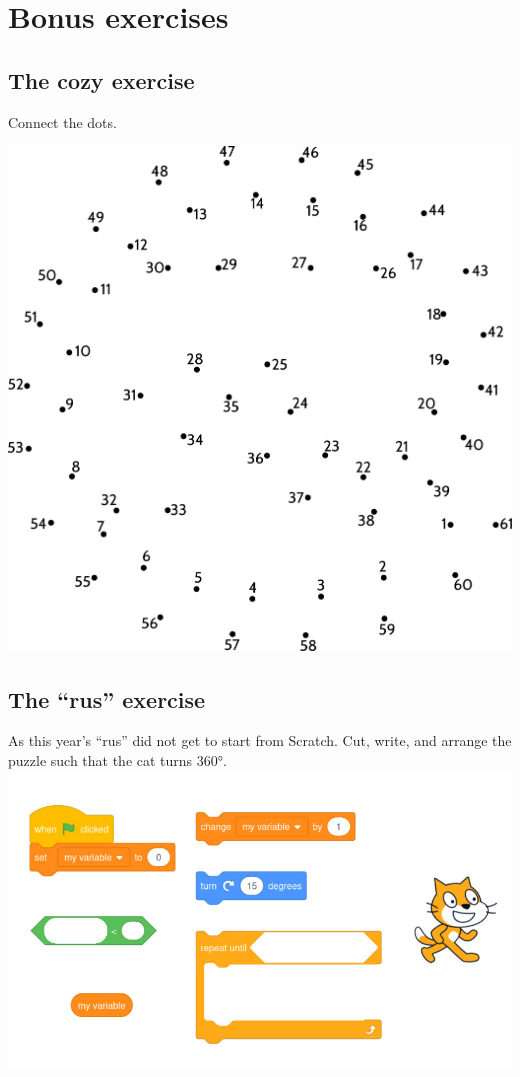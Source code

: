 \section{\huge{Bonus exercises}}

\subsection{The cozy exercise}

Connect the dots.

\begin{center}
\includegraphics[width=.99\textwidth]{forbind-prikkerne.pdf}
\end{center}


\newpage
\subsection{The ``rus'' exercise}
As this year's ``rus'' did not get to start from Scratch. Cut, write, and
arrange the puzzle such that the cat turns 360°.
\hspace*{-0.15\textwidth}\includegraphics[width=1.3\textwidth]{figures/scratch.jpg}
\vspace{-.9cm}
